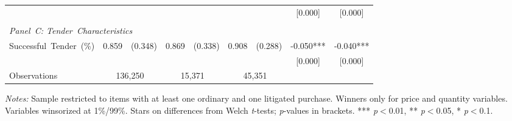 \begin{table}[ht]
{\begin{threeparttable}
\begin{tabular}{lcccccccc}
     & & & & & & & [0.000] & [0.000] \\
    \\[3pt]
    \multicolumn{9}{l}{\textit{Panel~C: Tender~Characteristics}} \\[3pt]
    Successful~Tender~(\%) & 0.859 & (0.348) & 0.869 & (0.338) & 0.908 & (0.288) & -0.050*** & -0.040*** \\
     & & & & & & & [0.000] & [0.000] \\
    \hline
    Observations & \multicolumn{2}{c}{136,250} & \multicolumn{2}{c}{15,371} & \multicolumn{2}{c}{45,351} & & \\
    \hline\hline
  \end{tabular}
  \begin{tablenotes}
    \small
    \item \textit{Notes:} Sample restricted to items with at least one ordinary and one litigated purchase. Winners only for price and quantity variables. Variables winsorized at 1\%/99\%. Stars on differences from Welch \textit{t}-tests; \textit{p}-values in brackets. *** \textit{p}$<$0.01, ** \textit{p}$<$0.05, * \textit{p}$<$0.1.
  \end{tablenotes}
  \end{threeparttable}
  }
\end{table}
